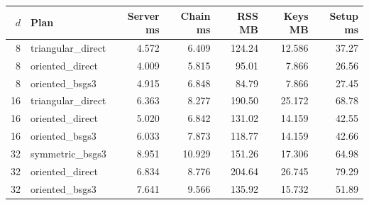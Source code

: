 \begin{tabular}{rlrrrrr}
\toprule
$d$ & Plan & Server ms & Chain ms & RSS MB & Keys MB & Setup ms \\
\midrule
8 & triangular\_direct & 4.572 & 6.409 & 124.24 & 12.586 & 37.27 \\
8 & oriented\_direct & 4.009 & 5.815 & 95.01 & 7.866 & 26.56 \\
8 & oriented\_bsgs3 & 4.915 & 6.848 & 84.79 & 7.866 & 27.45 \\
16 & triangular\_direct & 6.363 & 8.277 & 190.50 & 25.172 & 68.78 \\
16 & oriented\_direct & 5.020 & 6.842 & 131.02 & 14.159 & 42.55 \\
16 & oriented\_bsgs3 & 6.033 & 7.873 & 118.77 & 14.159 & 42.66 \\
32 & symmetric\_bsgs3 & 8.951 & 10.929 & 151.26 & 17.306 & 64.98 \\
32 & oriented\_direct & 6.834 & 8.776 & 204.64 & 26.745 & 79.29 \\
32 & oriented\_bsgs3 & 7.641 & 9.566 & 135.92 & 15.732 & 51.89 \\
\bottomrule
\end{tabular}
